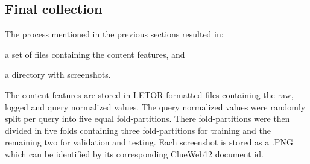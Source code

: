 \subsection{Final collection}\label{sec:finalcollection}
The process mentioned in the previous sections resulted in: 
\begin{inparaenum}[(i)]
\item a set of files containing the content features, and
\item a directory with screenshots.
\end{inparaenum}
The content features are stored in LETOR formatted files containing the raw, logged and query normalized values. The query normalized values were randomly split per query into five equal fold-partitions. There fold-partitions were then divided in five folds containing three fold-partitions for training and the remaining two for validation and testing. Each screenshot is stored as a .PNG which can be identified by its corresponding ClueWeb12 document id. 

